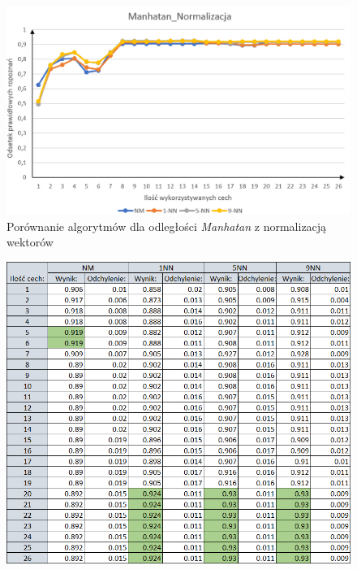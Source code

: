 \documentclass[12pt]{article}
\begin{document}
\begin{figure}[H]
	\centering
		\includegraphics[scale=0.66]{images/algorithms/manhatan_norm.png}
	\caption{Porównanie algorytmów dla odległości \textit{Manhatan} z normalizacją wektorów}
	\label{algorytmy_manhatan_norm_wyk}
\end{figure}

\begin{figure}[H]
	\centering
	\label{algorytmy_euklides_bnorm_tab}
		\includegraphics[scale=0.8]{images/algorithms/euklides_beznorm_tab.png}
\end{figure}
	
\end{document}
